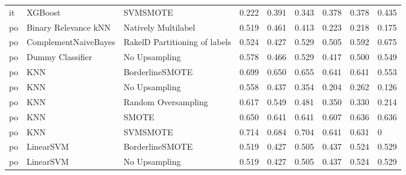 \begin{tabular}{lllllllll}
      it &                         XGBoost &                      SVMSMOTE & 0.222 &                     0.391 &                 0.343 &                  0.378 &                                   0.378 &     0.435 \\
      po &            Binary Relevance kNN &           Natively Multilabel & 0.519 &                     0.461 &                 0.413 &                  0.223 &                                   0.218 &     0.175 \\
      po &            ComplementNaiveBayes & RakelD Partitioning of labels & 0.524 &                     0.427 &                 0.529 &                  0.505 &                                   0.592 &     0.675 \\
      po &                Dummy Classifier &                 No Upsampling & 0.578 &                     0.466 &                 0.529 &                  0.417 &                                   0.500 &     0.549 \\
      po &                             KNN &               BorderlineSMOTE & 0.699 &                     0.650 &                 0.655 &                  0.641 &                                   0.641 &     0.553 \\
      po &                             KNN &                 No Upsampling & 0.558 &                     0.437 &                 0.354 &                  0.204 &                                   0.262 &     0.126 \\
      po &                             KNN &           Random Oversampling & 0.617 &                     0.549 &                 0.481 &                  0.350 &                                   0.330 &     0.214 \\
      po &                             KNN &                         SMOTE & 0.650 &                     0.641 &                 0.641 &                  0.607 &                                   0.636 &     0.636 \\
      po &                             KNN &                      SVMSMOTE & 0.714 &                     0.684 &                 0.704 &                  0.641 &                                   0.631 &         0 \\
      po &                       LinearSVM &               BorderlineSMOTE & 0.519 &                     0.427 &                 0.505 &                  0.437 &                                   0.524 &     0.529 \\
      po &                       LinearSVM &                 No Upsampling & 0.519 &                     0.427 &                 0.505 &                  0.437 &                                   0.524 &     0.529 \\

\end{tabular}
